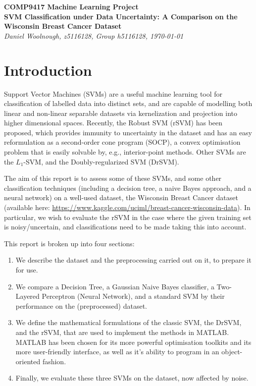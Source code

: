 \documentclass[11pt]{article}
\begin{document}
\begin{center}
\textbf{\large{COMP9417 Machine Learning Project}}
\\[10pt]
\textbf{\huge{SVM Classification under Data Uncertainty: A Comparison on the Wisconsin Breast Cancer Dataset}}
\\[10pt]
{\it \large{Daniel Woolnough, z5116128, Group h5116128, \today}}
\end{center}
\section*{Introduction}
Support Vector Machines (SVMs) are a useful machine learning tool for classification of labelled data into distinct sets, and are capable of modelling both linear and non-linear separable datasets via kernelization and projection into higher dimensional spaces. Recently, the Robust SVM (rSVM) has been proposed, which provides immunity to uncertainty in the dataset and has an easy reformulation as a second-order cone program (SOCP), a convex optimisation problem that is easily solvable by, e.g., interior-point methods. Other SVMs are the $L_1$-SVM, and the Doubly-regularized SVM (DrSVM). 

The aim of this report is to assess some of these SVMs, and some other classification techniques (including a decision tree, a naive Bayes approach, and a neural network) on a well-used dataset, the Wisconsin Breast Cancer dataset (available here: \url{https://www.kaggle.com/uciml/breast-cancer-wisconsin-data}). In particular, we wish to evaluate the rSVM in the case where the given training set is noisy/uncertain, and classifications need to be made taking this into account. 

This report is broken up into four sections:
\begin{enumerate}
	\item We describe the dataset and the preprocessing carried out on it, to prepare it for use. 
	\item We compare a Decision Tree, a Gaussian Naive Bayes classifier, a Two-Layered Perceptron (Neural Network), and a standard SVM by their performance on the (preprocessed) dataset. 
	\item We define the mathematical formulations of the classic SVM, the DrSVM, and the rSVM, that are used to implement the methods in MATLAB. MATLAB has been chosen for its more powerful optimisation toolkits and its more user-friendly interface, as well as it's ability to program in an object-oriented fashion. 
	\item Finally, we evaluate these three SVMs on the dataset, now affected by noise. 
\end{enumerate}
\end{document}
